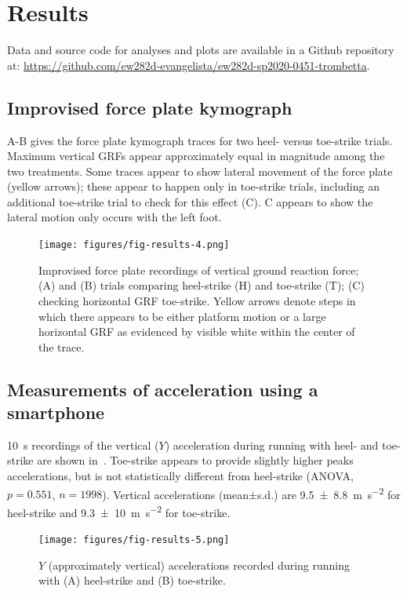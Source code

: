 \section{Results}
\label{sec:results}

Data and source code for analyses and plots are available in a Github repository at: \url{https://github.com/ew282d-evangelista/ew282d-sp2020-0451-trombetta}.

\subsection{Improvised force plate kymograph}
A-B gives the force plate kymograph traces for two heel- versus toe-strike trials. Maximum vertical GRFs appear approximately equal in magnitude among the two treatments.  Some traces appear to show lateral movement of the force plate (yellow arrows); these appear to happen only in toe-strike trials, including an additional toe-strike trial to check for this effect (C). C appears to show the lateral motion only occurs with the left foot. 
\begin{figure}
\begin{center}
\texttt{[image: figures/fig-results-4.png]}
\end{center}
\caption{Improvised force plate recordings of vertical ground reaction force; (A) and (B) trials comparing heel-strike (H) and toe-strike (T); (C) checking horizontal GRF toe-strike. Yellow arrows denote steps in which there appears to be either platform motion or a large horizontal GRF as evidenced by visible white within the center of the trace.}
\label{fig:results:forceplate}
\end{figure}





\subsection{Measurements of acceleration using a smartphone}
\SI{10}{\second} recordings of the vertical ($Y$) acceleration during running with heel- and toe-strike are shown in~. Toe-strike appears to provide slightly higher peaks accelerations, but is not statistically different from heel-strike (ANOVA, $p=0.551$, $n=1998$). Vertical accelerations (mean$\pm$s.d.) are \SI{9.5\pm8.8}{\meter\per\second\squared} for heel-strike and \SI{9.3\pm10}{\meter\per\second\squared} for toe-strike. 
\begin{figure}[h]
\begin{center}
\texttt{[image: figures/fig-results-5.png]}
\end{center}
\caption{$Y$ (approximately vertical) accelerations recorded during running with (A) heel-strike and (B) toe-strike.}
\label{fig:results:accel}
\end{figure}





